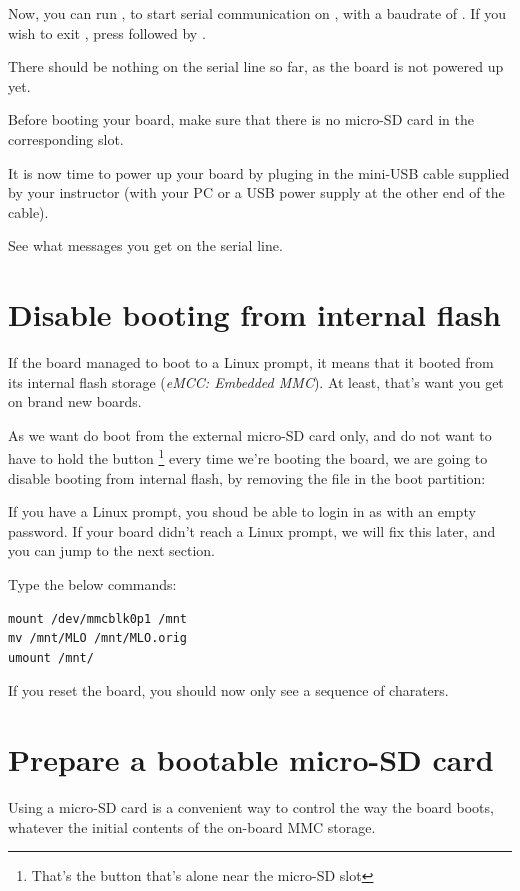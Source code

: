 Now, you can run , to start serial
communication on , with a baudrate of . If
you wish to exit , press \code{[Ctrl][a]} followed by
\code{[Ctrl][x]}.

There should be nothing on the serial line so far, as the board is not
powered up yet.

Before booting your board, make sure that there is no micro-SD card
in the corresponding slot.

It is now time to power up your board by pluging in the mini-USB
cable supplied by your instructor (with your PC or a USB power supply at the
other end of the cable).

See what messages you get on the serial line.

\section{Disable booting from internal flash}

If the board managed to boot to a Linux prompt, it means that 
it booted from its internal flash storage ({\em eMCC: Embedded MMC}).
At least, that's want you get on brand new boards.

As we want do boot from the external micro-SD card only,
and do not want to have to hold the  button \footnote{That's
the button that's alone near the micro-SD slot} every time we're booting
the board, we are going to disable booting from internal flash, by
removing the  file in the boot partition:  

If you have a Linux prompt, you shoud be able to login in as 
with an empty password. If your board didn't reach a Linux prompt, we
will fix this later, and you can jump to the next section. 

Type the below commands:

\begin{verbatim}
mount /dev/mmcblk0p1 /mnt
mv /mnt/MLO /mnt/MLO.orig
umount /mnt/
\end{verbatim}

If you reset the board, you should now only see a sequence of 
charaters.

\section{Prepare a bootable micro-SD card}

Using a micro-SD card is a convenient way to control the way
the board boots, whatever the initial contents of the on-board MMC
storage.

